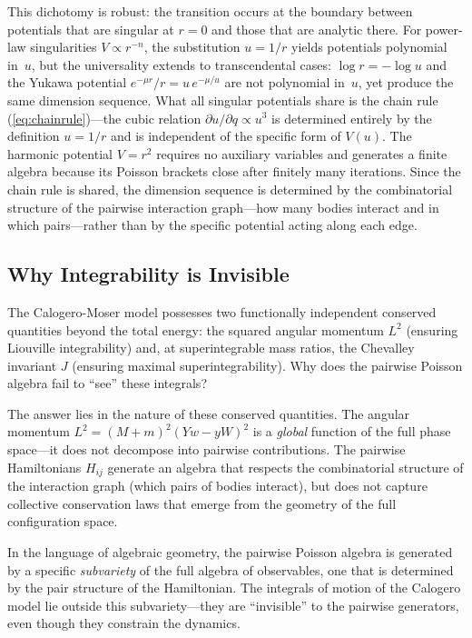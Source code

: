 \documentclass[aps,prl,twocolumn,superscriptaddress,showpacs]{revtex4-2}
\begin{document}
This dichotomy is robust: the transition occurs at the boundary
between potentials that are singular at $r = 0$ and those that are
analytic there.  For power-law singularities $V \propto r^{-n}$,
the substitution $u = 1/r$ yields potentials polynomial in~$u$, but
the universality extends to transcendental cases: $\log r = -\log u$
and the Yukawa potential $e^{-\mu r}/r = u\,e^{-\mu/u}$ are not
polynomial in~$u$, yet produce the same dimension sequence.  What
all singular potentials share is the chain rule
(\ref{eq:chainrule})---the cubic relation $\partial u/\partial q
\propto u^3$ is determined entirely by the definition $u = 1/r$ and
is independent of the specific form of $V(u)$.  The harmonic
potential $V = r^2$ requires no auxiliary variables and generates a
finite algebra because its Poisson brackets close after finitely many
iterations.  Since the chain rule is shared, the dimension sequence
is determined by the combinatorial structure of the pairwise
interaction graph---how many bodies interact and in which
pairs---rather than by the specific potential acting along each edge.

\subsection{Why Integrability is Invisible}

The Calogero-Moser model possesses two functionally independent
conserved quantities beyond the total energy: the squared angular
momentum $L^2$ (ensuring Liouville integrability) and, at
superintegrable mass ratios, the Chevalley invariant $J$ (ensuring
maximal superintegrability).  Why does the pairwise Poisson algebra
fail to ``see'' these integrals?

The answer lies in the nature of these conserved quantities.  The
angular momentum $L^2 = (M+m)^2(Yw - yW)^2$ is a \emph{global}
function of the full phase space---it does not decompose into pairwise
contributions.  The pairwise Hamiltonians $H_{ij}$ generate an algebra
that respects the combinatorial structure of the interaction graph
(which pairs of bodies interact), but does not capture collective
conservation laws that emerge from the geometry of the full
configuration space.

In the language of algebraic geometry, the pairwise Poisson algebra
is generated by a specific \emph{subvariety} of the full algebra of
observables, one that is determined by the pair structure of the
Hamiltonian.  The integrals of motion of the Calogero model lie
outside this subvariety---they are ``invisible'' to the pairwise
generators, even though they constrain the dynamics.
\end{document}
